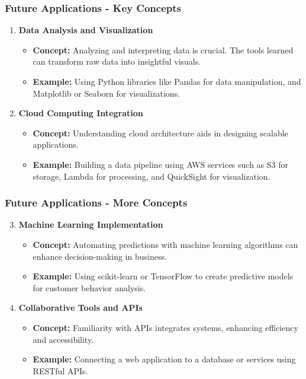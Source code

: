 \documentclass[aspectratio=169]{beamer}
\begin{document}
\begin{frame}[fragile]
    \frametitle{Future Applications - Key Concepts}
    \begin{enumerate}
        \item \textbf{Data Analysis and Visualization}
            \begin{itemize}
                \item \textbf{Concept:} Analyzing and interpreting data is crucial. The tools learned can transform raw data into insightful visuals.
                \item \textbf{Example:} Using Python libraries like Pandas for data manipulation, and Matplotlib or Seaborn for visualizations.
            \end{itemize}
        
        \item \textbf{Cloud Computing Integration}
            \begin{itemize}
                \item \textbf{Concept:} Understanding cloud architecture aids in designing scalable applications. 
                \item \textbf{Example:} Building a data pipeline using AWS services such as S3 for storage, Lambda for processing, and QuickSight for visualization.
            \end{itemize}
    \end{enumerate}
\end{frame}

\begin{frame}[fragile]
    \frametitle{Future Applications - More Concepts}
    \begin{enumerate}
        \setcounter{enumii}{2} %
        \item \textbf{Machine Learning Implementation}
            \begin{itemize}
                \item \textbf{Concept:} Automating predictions with machine learning algorithms can enhance decision-making in business.
                \item \textbf{Example:} Using scikit-learn or TensorFlow to create predictive models for customer behavior analysis.
            \end{itemize}
        
        \item \textbf{Collaborative Tools and APIs}
            \begin{itemize}
                \item \textbf{Concept:} Familiarity with APIs integrates systems, enhancing efficiency and accessibility.
                \item \textbf{Example:} Connecting a web application to a database or services using RESTful APIs.
            \end{itemize}
    \end{enumerate}
\end{frame}
\end{document}
